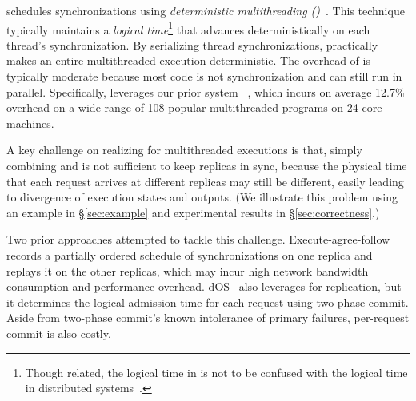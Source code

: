 
\xxx schedules synchronizations using \emph{deterministic multithreading 
(\dmt)}~\cite{dpj:oopsla09,dmp:asplos09,kendo:asplos09,coredet:asplos10, 
dos:osdi10,ddos:asplos13,ics:oopsla13}.  This technique typically maintains a 
\emph{logical time}\footnote{Though related, the logical time in \dmt is not to 
be confused with the logical time in distributed systems~\cite{lamportclock}.} 
that advances deterministically on each thread's synchronization. By 
serializing thread synchronizations, \dmt practically makes an entire 
multithreaded execution deterministic. The overhead of \dmt is typically 
moderate because most code is not synchronization and can still run in parallel. 
Specifically, \xxx leverages our prior \dmt system
\parrot~\cite{parrot:sosp13}, which incurs on average 12.7\% overhead
on a wide range of 108 popular multithreaded programs on 24-core machines.

A key challenge on realizing \smr for multithreaded executions is that,
simply combining \paxos and \dmt is not sufficient to keep replicas in
sync, because the physical time that each request arrives at different
replicas may still be different, easily leading to divergence of execution
states and outputs.  (We illustrate this problem using an example in
\S\ref{sec:example} and experimental results in \S\ref{sec:correctness}.)


Two prior approaches attempted to tackle this challenge.  
Execute-agree-follow~\cite{rex:eurosys14} records a partially
ordered schedule of \pthread synchronizations on one replica and replays it 
on the other replicas, which may incur high network bandwidth 
consumption and performance overhead. dOS~\cite{dos:osdi10} also leverages
\dmt for replication, but it determines the logical admission time for
each request using two-phase commit.  Aside from two-phase commit's known
intolerance of primary failures, per-request commit is also costly.

